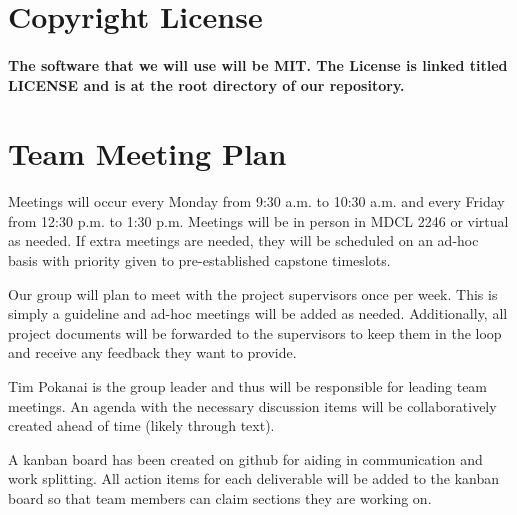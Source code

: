 \documentclass{article}
\begin{document}

\section{Copyright License}

\paragraph{The software that we will use will be MIT. The License is linked titled LICENSE and is at the root directory of our repository.}


\section{Team Meeting Plan}





\par{\indent Meetings will occur every Monday from 9:30 a.m. to 10:30 a.m. and every Friday from 12:30 p.m. to 1:30 p.m. Meetings will
be in person in MDCL 2246 or virtual as needed. If extra meetings are needed, they will be scheduled on an ad-hoc basis with priority given to pre-established capstone timeslots.

Our group will plan to meet with the project supervisors once per week. This is simply a guideline and ad-hoc meetings
will be added as needed. Additionally, all project documents will be forwarded to the supervisors to keep them in the loop and receive any feedback they want to provide.

Tim Pokanai is the group leader and thus will be responsible for leading team meetings. An agenda with the necessary 
discussion items will be collaboratively created ahead of time (likely through text).

A kanban board has been created on github for aiding in communication and work splitting. All action items for each deliverable will
be added to the kanban board so that team members can claim sections they are working on.
}
\end{document}
